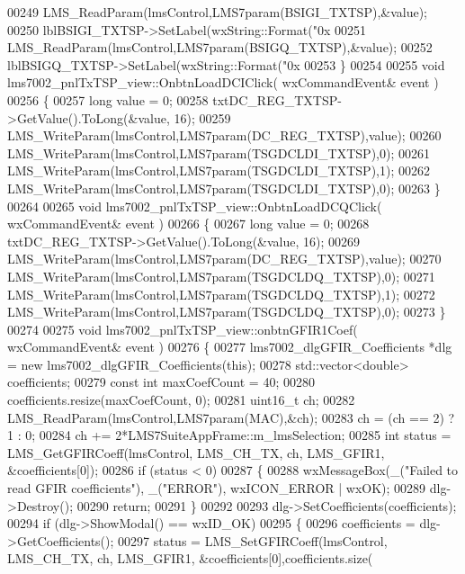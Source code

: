 \begin{DoxyCode}
{{{{00249     LMS_ReadParam(lmsControl,LMS7param(BSIGI_TXTSP),&value);
00250     lblBSIGI_TXTSP->SetLabel(wxString::Format(\textcolor{stringliteral}{"0x%
00251     LMS_ReadParam(lmsControl,LMS7param(BSIGQ_TXTSP),&value);
00252     lblBSIGQ_TXTSP->SetLabel(wxString::Format(\textcolor{stringliteral}{"0x%
00253 \}
00254 
00255 \textcolor{keywordtype}{void} lms7002_pnlTxTSP_view::OnbtnLoadDCIClick( wxCommandEvent& event )
00256 \{
00257     \textcolor{keywordtype}{long} value = 0;
00258     txtDC_REG_TXTSP->GetValue().ToLong(&value, 16);
00259     LMS_WriteParam(lmsControl,LMS7param(DC_REG_TXTSP),value);
00260     LMS_WriteParam(lmsControl,LMS7param(TSGDCLDI_TXTSP),0);
00261     LMS_WriteParam(lmsControl,LMS7param(TSGDCLDI_TXTSP),1);
00262     LMS_WriteParam(lmsControl,LMS7param(TSGDCLDI_TXTSP),0);
00263 \}
00264 
00265 \textcolor{keywordtype}{void} lms7002_pnlTxTSP_view::OnbtnLoadDCQClick( wxCommandEvent& event )
00266 \{
00267     \textcolor{keywordtype}{long} value = 0;
00268     txtDC_REG_TXTSP->GetValue().ToLong(&value, 16);
00269     LMS_WriteParam(lmsControl,LMS7param(DC_REG_TXTSP),value);
00270     LMS_WriteParam(lmsControl,LMS7param(TSGDCLDQ_TXTSP),0);
00271     LMS_WriteParam(lmsControl,LMS7param(TSGDCLDQ_TXTSP),1);
00272     LMS_WriteParam(lmsControl,LMS7param(TSGDCLDQ_TXTSP),0);
00273 \}
00274 
00275 \textcolor{keywordtype}{void} lms7002_pnlTxTSP_view::onbtnGFIR1Coef( wxCommandEvent& event )
00276 \{
00277     lms7002_dlgGFIR_Coefficients *dlg = \textcolor{keyword}{new} lms7002_dlgGFIR_Coefficients(\textcolor{keyword}{this});
00278     std::vector<double> coefficients;
00279     \textcolor{keyword}{const} \textcolor{keywordtype}{int} maxCoefCount = 40;
00280     coefficients.resize(maxCoefCount, 0);
00281     uint16\_t ch;
00282     LMS_ReadParam(lmsControl,LMS7param(MAC),&ch);
00283     ch = (ch == 2) ? 1 : 0;
00284     ch += 2*LMS7SuiteAppFrame::m_lmsSelection;
00285     \textcolor{keywordtype}{int} status =  LMS_GetGFIRCoeff(lmsControl, LMS_CH_TX, ch, LMS_GFIR1, &coefficients[0]);
00286     \textcolor{keywordflow}{if} (status < 0)
00287     \{
00288         wxMessageBox(\_(\textcolor{stringliteral}{"Failed to read GFIR coefficients"}), \_(\textcolor{stringliteral}{"ERROR"}), wxICON\_ERROR | wxOK);
00289         dlg->Destroy();
00290         \textcolor{keywordflow}{return};
00291     \}
00292 
00293     dlg->SetCoefficients(coefficients);
00294     \textcolor{keywordflow}{if} (dlg->ShowModal() == wxID\_OK)
00295     \{
00296         coefficients = dlg->GetCoefficients();
00297         status = LMS_SetGFIRCoeff(lmsControl, LMS_CH_TX, ch, LMS_GFIR1, &coefficients[0],coefficients.size(
}}}}}}
\end{DoxyCode}
